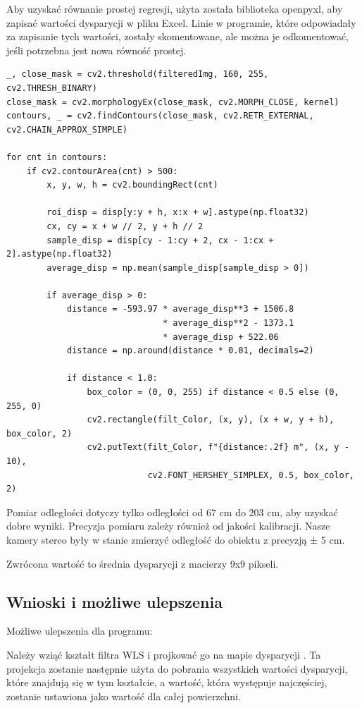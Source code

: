 \documentclass[magisterska]{pracadypl}
\begin{document}
Aby uzyskać równanie prostej regresji, użyta została biblioteka openpyxl, aby zapisać wartości dysparycji w pliku Excel. Linie w programie, które odpowiadały za zapisanie tych wartości, zostały skomentowane, ale można je odkomentować, jeśli potrzebna jest nowa równość prostej.

\begin{lstlisting}[style=mypython]
_, close_mask = cv2.threshold(filteredImg, 160, 255, cv2.THRESH_BINARY)
close_mask = cv2.morphologyEx(close_mask, cv2.MORPH_CLOSE, kernel)
contours, _ = cv2.findContours(close_mask, cv2.RETR_EXTERNAL, cv2.CHAIN_APPROX_SIMPLE)

for cnt in contours:
    if cv2.contourArea(cnt) > 500:
        x, y, w, h = cv2.boundingRect(cnt)

        roi_disp = disp[y:y + h, x:x + w].astype(np.float32)
        cx, cy = x + w // 2, y + h // 2
        sample_disp = disp[cy - 1:cy + 2, cx - 1:cx + 2].astype(np.float32)
        average_disp = np.mean(sample_disp[sample_disp > 0])

        if average_disp > 0:
            distance = -593.97 * average_disp**3 + 1506.8 
                               * average_disp**2 - 1373.1 
                               * average_disp + 522.06
            distance = np.around(distance * 0.01, decimals=2)

            if distance < 1.0:
                box_color = (0, 0, 255) if distance < 0.5 else (0, 255, 0)
                cv2.rectangle(filt_Color, (x, y), (x + w, y + h), box_color, 2)
                cv2.putText(filt_Color, f"{distance:.2f} m", (x, y - 10),
                            cv2.FONT_HERSHEY_SIMPLEX, 0.5, box_color, 2)
\end{lstlisting}

Pomiar odległości dotyczy tylko odległości od 67 cm do 203 cm, aby uzyskać dobre wyniki. Precyzja pomiaru zależy również od jakości kalibracji. Nasze kamery stereo były w stanie zmierzyć odległość do obiektu z precyzją ± 5 cm.

Zwrócona wartość to średnia dysparycji z macierzy 9x9 pikseli.

\subsection{Wnioski i możliwe ulepszenia}

Możliwe ulepszenia dla programu:

Należy wziąć kształt filtra WLS i projkować go na mapie dysparycji \cite{rao}. Ta projekcja zostanie następnie użyta do pobrania wszystkich wartości dysparycji, które znajdują się w tym kształcie, a wartość, która występuje najczęściej, zostanie ustawiona jako wartość dla całej powierzchni.
\end{document}
